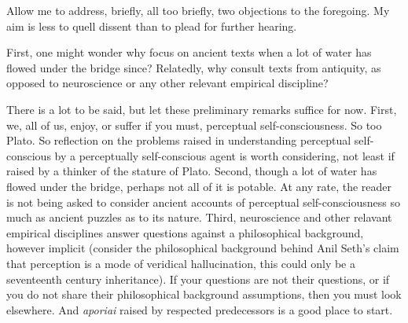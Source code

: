 Allow me to address, briefly, all too briefly, two objections to the foregoing. My aim is less to quell dissent than to plead for further hearing.

First, one might wonder why focus on ancient texts when a lot of water has flowed under the bridge since? Relatedly, why consult texts from antiquity, as opposed to neuroscience or any other relevant empirical discipline?

There is a lot to be said, but let these preliminary remarks suffice for now. First, we, all of us, enjoy, or suffer if you must, perceptual self-consciousness. So too Plato. So reflection on the problems raised in understanding perceptual self-conscious by a perceptually self-conscious agent is worth considering, not least if raised by a thinker of the stature of Plato. Second, though a lot of water has flowed under the bridge, perhaps not all of it is potable. At any rate, the reader is not being asked to consider ancient accounts of perceptual self-consciousness so much as ancient puzzles as to its nature. Third, neuroscience and other relavant empirical disciplines answer questions against a philosophical background, however implicit (consider the philosophical background behind Anil Seth's claim that perception is a mode of veridical hallucination, this could only be a seventeenth century inheritance). If your questions are not their questions, or if you do not share their philosophical background assumptions, then you must look elsewhere. And \emph{aporiai} raised by respected predecessors is a good place to start.

